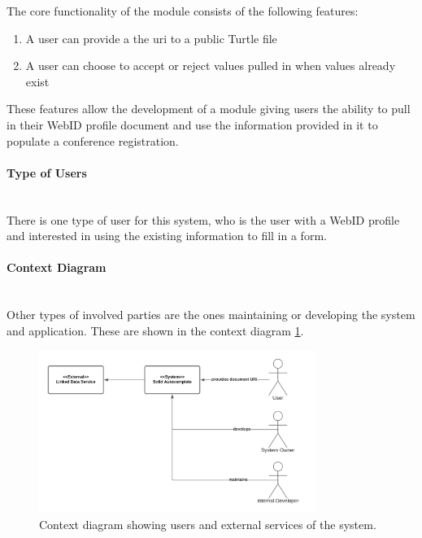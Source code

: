The core functionality of the module consists of the following features: 

\vspace{-3mm}
\begin{enumerate}
    \item A user can provide a the \gls{uri} to a public Turtle file
    \item A user can choose to accept or reject values pulled in when values already exist
\end{enumerate}
\vspace{-3mm}

These features allow the development of a module giving users the ability to pull in their WebID profile document and use the information provided in it to populate a conference registration.
\vspace{0.5cm}
\paragraph{Type of Users}\mbox{}\\

There is one type of user for this system, who is the user with a WebID profile and interested in using the existing information to fill in a form.
\vspace{0.5cm}
\paragraph{Context Diagram}\mbox{}\\

Other types of involved parties are the ones maintaining or developing the system and application. These are shown in the context diagram \ref{fig:poc-autocomplete-context_diagram}.

\begin{figure}[H]
    \centering
    \includegraphics[width=0.8\textwidth]{prototype/graphs/poc-autocomplete-context_diagram.png}
    \caption{Context diagram showing users and external services of the system.}
    \label{fig:poc-autocomplete-context_diagram}
\end{figure}
\vspace{0.5cm}
